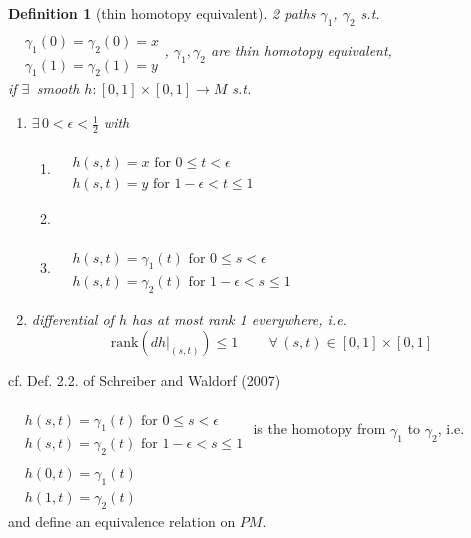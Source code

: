 \documentclass[10pt]{amsart}
\newtheorem{definition}{Definition}
\begin{document}
\begin{multicols*}{2}
\begin{definition}[thin homotopy equivalent]
2 paths $\gamma_1$, $\gamma_2$ s.t. $\begin{aligned} & \quad \\ & \gamma_1(0) = \gamma_2(0) = x \\
& \gamma_1(1) = \gamma_2(1) = y \end{aligned}$, $\gamma_1, \gamma_2$ are thin homotopy equivalent, \\
if $\exists \, $ smooth $h: [0,1] \times [0,1] \to M$ s.t. 
\begin{enumerate}
	\item $\exists \, 0 < \epsilon < \frac{1}{2} $ with 
	\begin{enumerate}
		\item $\begin{aligned} & \qquad \\
		& h(s,t) = x \text{ for } 0 \leq t < \epsilon \\
		& h(s,t) = y \text{ for } 1-\epsilon < t \leq  1 \end{aligned}$ 
		\item 		\item $\begin{aligned} & \qquad \\
		& h(s,t) = \gamma_1(t) \text{ for } 0 \leq s < \epsilon \\
		& h(s,t) = \gamma_2(t) \text{ for } 1-\epsilon < s \leq  1 \end{aligned}$
	\end{enumerate}
\item differential of $h$ has at most rank 1 everywhere, i.e. 
\begin{equation}
\text{rank}(\left. dh\right|_{(s,t)}) \leq 1 \qquad \, \forall \, (s,t) \in [0,1]\times [0,1]
\end{equation}
\end{enumerate}
\end{definition}
cf. Def. 2.2. of Schreiber and Waldorf (2007)\cite{ScWa2007}  

$\begin{aligned} & \qquad \\
& h(s,t) = \gamma_1(t) \text{ for } 0 \leq s < \epsilon \\
& h(s,t) = \gamma_2(t) \text{ for } 1-\epsilon < s \leq  1 \end{aligned}$ is the homotopy from $\gamma_1$ to $\gamma_2$, i.e. $\begin{aligned} & \quad \\ 
& h(0,t) = \gamma_1(t) \\
& h(1,t) = \gamma_2(t) \end{aligned}$  \\
and define an equivalence relation on $PM$.  


\end{multicols*}
\end{document}
